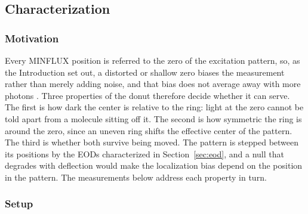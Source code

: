 \documentclass{article}
\begin{document}
\subsection{Characterization}

\subsubsection{Motivation}

Every MINFLUX position is referred to the zero of the excitation pattern, so, as the Introduction
set out, a distorted or shallow zero biases the measurement rather than merely adding noise, and
that bias does not average away with more photons \cite{stallingaAbsorptionDipoleEffects2026}.
Three properties of the donut therefore decide whether it can serve. The first is how dark the
center is relative to the ring: light at the zero cannot be told apart from a molecule sitting off
it. The second is how symmetric the ring is around the zero, since an uneven ring shifts the
effective center of the pattern. The third is whether both survive being moved. The pattern is
stepped between its positions by the EODs characterized in Section~\ref{sec:eod}, and a null
that degrades with deflection would make the localization bias depend on the position in the
pattern. The measurements below address each property in turn.

\subsubsection{Setup}
\end{document}
